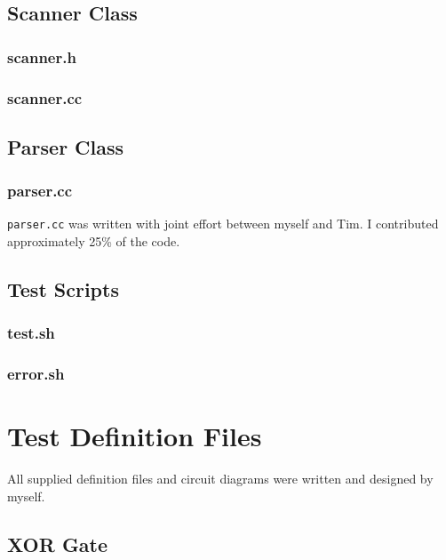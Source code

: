 \documentclass[a4paper,10pt]{article}
\begin{document}
\subsection{Scanner Class}
\subsubsection{scanner.h}

\subsubsection{scanner.cc}


\subsection{Parser Class}
\subsubsection{parser.cc}


\texttt{parser.cc} was written with joint effort between myself and Tim. I contributed approximately 25\% of the code.

\subsection{Test Scripts}
\label{sec:tests}
\subsubsection{test.sh}

\subsubsection{error.sh}

\pagebreak

\section{Test Definition Files}
\label{sec:examples}

All supplied definition files and circuit diagrams were written and designed by myself.

\subsection{XOR Gate}
\end{document}

